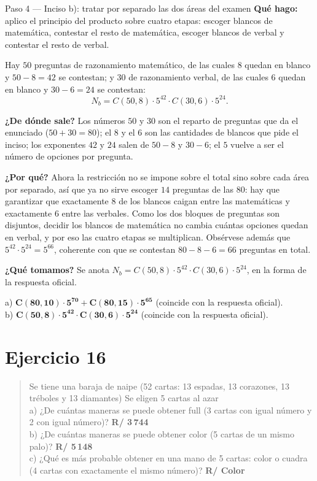 \documentclass[11pt]{article}
\begin{document}
\begin{paso}{Paso 4 --- Inciso b): tratar por separado las dos áreas del examen}
\textbf{Qué hago:} aplico el principio del producto sobre cuatro etapas: escoger blancos de matemática, contestar el resto de matemática, escoger blancos de verbal y contestar el resto de verbal.

Hay $50$ preguntas de razonamiento matemático, de las cuales $8$ quedan en blanco y $50-8=42$ se contestan; y $30$ de razonamiento verbal, de las cuales $6$ quedan en blanco y $30-6=24$ se contestan:
\[
  N_b = C(50,8)\cdot 5^{42}\cdot C(30,6)\cdot 5^{24}.
\]

\textbf{¿De dónde sale?} Los números $50$ y $30$ son el reparto de preguntas que da el enunciado ($50+30=80$); el $8$ y el $6$ son las cantidades de blancos que pide el inciso; los exponentes $42$ y $24$ salen de $50-8$ y $30-6$; el $5$ vuelve a ser el número de opciones por pregunta.

\textbf{¿Por qué?} Ahora la restricción no se impone sobre el total sino sobre cada área por separado, así que ya no sirve escoger $14$ preguntas de las $80$: hay que garantizar que exactamente $8$ de los blancos caigan entre las matemáticas y exactamente $6$ entre las verbales. Como los dos bloques de preguntas son disjuntos, decidir los blancos de matemática no cambia cuántas opciones quedan en verbal, y por eso las cuatro etapas se multiplican. Obsérvese además que $5^{42}\cdot 5^{24}=5^{66}$, coherente con que se contestan $80-8-6=66$ preguntas en total.

\textbf{¿Qué tomamos?} Se anota $N_b=C(50,8)\cdot 5^{42}\cdot C(30,6)\cdot 5^{24}$, en la forma de la respuesta oficial.
\end{paso}

\begin{resp}
a) $\mathbf{C(80,10)\cdot 5^{70}+C(80,15)\cdot 5^{65}}$ (coincide con la respuesta oficial).\\
b) $\mathbf{C(50,8)\cdot 5^{42}\cdot C(30,6)\cdot 5^{24}}$ (coincide con la respuesta oficial).
\end{resp}

\section*{Ejercicio 16}

\begin{quote}
Se tiene una baraja de naipe (52 cartas: 13 espadas, 13 corazones, 13 tréboles y 13 diamantes) Se eligen 5 cartas al azar\\[2pt]
a) ¿De cuántas maneras se puede obtener full (3 cartas con igual número y 2 con igual número)? \quad \textbf{R/ 3\,744}\\
b) ¿De cuántas maneras se puede obtener color (5 cartas de un mismo palo)? \quad \textbf{R/ 5\,148}\\
c) ¿Qué es más probable obtener en una mano de 5 cartas: color o cuadra (4 cartas con exactamente el mismo número)? \quad \textbf{R/ Color}
\end{quote}
\end{document}
